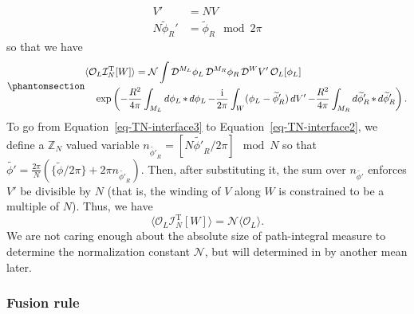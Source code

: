 \documentclass[
  letterpaper,
  DIV=11,
  numbers=noendperiod]{scrreport}
\DeclareMathOperator{\imunit}{i}
\begin{document}
\[
\begin{aligned}
V' &= NV \\
N \widetilde\phi_R' &= \widetilde\phi_R \mod 2\pi
\end{aligned}
\] so that we have
\begin{equation}\phantomsection\label{eq-TN-interface3}{
\begin{multlined}
\langle\mathcal{O}_L \mathcal{I}^\text{T}_N[W] \rangle = \mathcal{N} 
\int \mathop{\mathcal{D}^{M_L}\phi_L}\mathop{\mathcal{D}^{M_R}\phi_R}\mathop{\mathcal{D}^{W}V'}
\mathcal{O}_L[\phi_L]\\
\exp\left(-\frac{R^2}{4\pi}\int_{M_L}\mathop{d\phi_L}*\mathop{d\phi_L}
-\frac{\imunit }{2\pi}\int_W ( \phi_L - \widetilde{\phi}_R')\mathop{dV'}
-\frac{R^2}{4\pi}\int_{M_R}\mathop{d\widetilde\phi_R'}*\mathop{d\widetilde\phi_R'}\right).
\end{multlined}
}\end{equation} To go from Equation~\ref{eq-TN-interface3} to
Equation~\ref{eq-TN-interface2}, we define a \(\mathbb{Z}_N\) valued
variable
\(n_{\widetilde{\phi'}_R} = [N\widetilde{\phi'}_R/2\pi] \mod N\) so that
\(\widetilde{\phi'} = \frac{2\pi}{N}(\{\widetilde{\phi}/2\pi\} + 2\pi n_{\widetilde{\phi'}_R})\).
Then, after substituting it, the sum over \(n_{\widetilde{\phi'}}\)
enforces \(V'\) be divisible by \(N\) (that is, the winding of \(V\)
along \(W\) is constrained to be a multiple of \(N\)). Thus, we have
\[\langle\mathcal{O}_L \mathcal{I}_N^\text{T}[W]\rangle = \mathcal{N} \langle \mathcal{O}_L \rangle.
\] We are not caring enough about the absolute size of path-integral
measure to determine the normalization constant \(\mathcal{N}\), but
will determined in by another mean later.

\subsubsection{Fusion rule}\label{fusion-rule}
\end{document}
